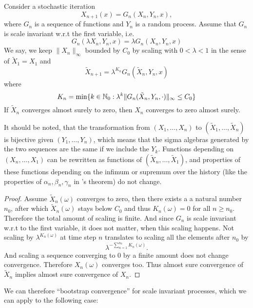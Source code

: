 \begin{lemma}\label{scaling lemma}
    Consider a stochastic iteration 
    \[
        X_{n+1}(x)=G_n(X_n, Y_n,x),
    \]
    where \(G_n\) is a sequence of functions and \(Y_n\) is a random process. Assume that \(G_n\) is scale invariant w.r.t the first variable, i.e.
    \[
        G_n(\lambda X_n, Y_n, x)=\lambda G_n(X_n,Y_n,x)
    \]
    We say, we keep \(\|X_n\|_\infty\) bounded by \(C_0\) by scaling with \(0<\lambda<1\) in the sense of \(\tilde{X}_1=X_1\) and
    \[
        \tilde{X}_{n+1} =\lambda^{K_n} G_n(\tilde{X}_n, Y_n,x)
    \]
    where
    \[
        K_n=\min\{k\in\mathbb{N}_0 : \lambda^k \|G_n(\tilde{X}_n, Y_n,\cdot)\|_\infty \le C_0\}
    \]
    If \(\tilde{X}_n\) converges almost surely to zero, then \(X_n\) converges to zero almost surely. 
\end{lemma}
\begin{remark}
    It should be noted, that the transformation from \((X_1, \dots,  X_n)\) to \((\tilde{X}_1, \dots, \tilde{X}_n)\) is bijective given \((Y_1,\dots, Y_n)\), which means that the sigma algebras generated by the two sequences are the same if we include the \(Y_k\). Functions depending on \((X_n,\dots,X_1)\) can be rewritten as functions of \((\tilde{X}_n,\dots,\tilde{X}_1)\), and properties of these functions depending on the infimum or supremum over the history (like the properties of \(\alpha_n,\beta_n,\gamma_n\) in \citeauthor{dvoretzkyStochasticApproximation1956}'s theorem) do not change.
\end{remark}
\begin{proof}
    Assume \(\tilde{X}_n(\omega)\) converges to zero, then there exists a a natural number \(n_0\), after which \(\tilde{X}_n(\omega)\) stays below \(C_0\) and thus \(K_n(\omega)=0\) for all \(n\ge n_0\). Therefore the total amount of scaling is finite. And since \(G_n\) is scale invariant w.r.t to the first variable, it does not matter, when this scaling happens. Not scaling by \(\lambda^{K_n(\omega)}\) at time step \(n\) translates to scaling all the elements after \(n_0\) by 
    \[
        \lambda^{-\sum_{n=1}^{n_0}K_n(\omega)}.
    \] 
    And scaling a sequence converging to 0 by a finite amount does not change convergence. Therefore \(X_n(\omega)\) converges too. Thus almost sure convergence of \(\tilde{X}_n\) implies almost sure convergence of \(X_n\).
\end{proof}

We can therefore ``bootstrap convergence'' for scale invariant processes, which we can apply to the following case:

